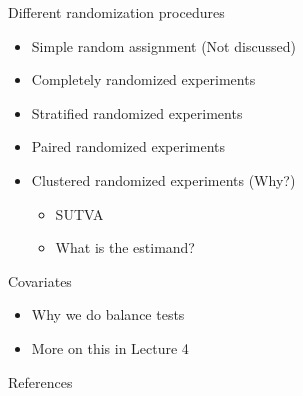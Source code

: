 \documentclass[xcolor={dvipsnames},handout]{beamer}
\begin{document}
\begin{frame}{Different randomization procedures}
\citep{athey2017econometrics}
\vfill
\begin{itemize}
\item Simple random assignment (Not discussed)
\item Completely randomized experiments
\item Stratified randomized experiments
\item Paired randomized experiments
\item Clustered randomized experiments  (Why?)
\begin{itemize}
\item SUTVA
\item What is the estimand?
\end{itemize}
\end{itemize}

\end{frame}



\begin{frame}{Covariates}

\begin{itemize}
\item Why we do balance tests
\item More on this in Lecture 4
\end{itemize}

\end{frame}



\backupbegin

\begin{frame}[allowframebreaks]{References}
    
    
\end{frame}
\backupend
\end{document}
